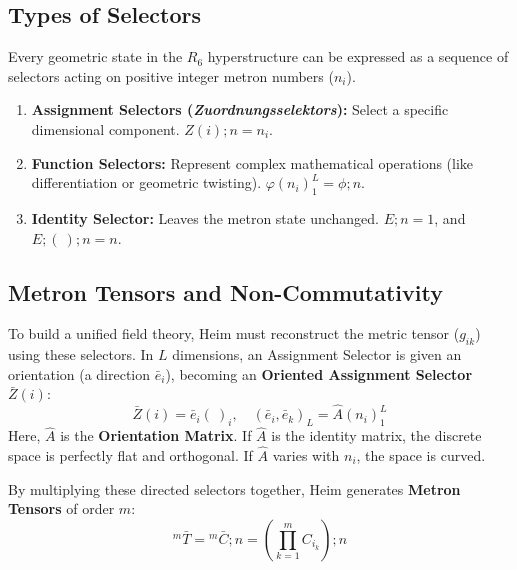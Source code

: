 \documentclass[11pt,a4paper,oneside]{article}
\begin{document}
\subsection{Types of Selectors}

Every geometric state in the $R_6$ hyperstructure can be expressed as a sequence of selectors acting on positive integer metron numbers ($n_i$).

\begin{enumerate}
    \item \textbf{Assignment Selectors (\textit{Zuordnungsselektors}):} Select a specific dimensional component. $Z(i); n = n_i$.
    \item \textbf{Function Selectors:} Represent complex mathematical operations (like differentiation or geometric twisting). $\varphi(n_i)_1^L = \phi; n$.
    \item \textbf{Identity Selector:} Leaves the metron state unchanged. $E; n = 1$, and $E; (\ ); n = n$.
\end{enumerate}

\subsection{Metron Tensors and Non-Commutativity}

To build a unified field theory, Heim must reconstruct the metric tensor ($g_{ik}$) using these selectors. In $L$ dimensions, an Assignment Selector is given an orientation (a direction $\bar{e}_i$), becoming an \textbf{Oriented Assignment Selector} $\bar{Z}(i)$:
\begin{equation}
    \bar{Z}(i) = \bar{e}_i (\ )_i, \quad (\bar{e}_i, \bar{e}_k)_L = \hat{A}(n_i)_1^L
\end{equation}
Here, $\hat{A}$ is the \textbf{Orientation Matrix}. If $\hat{A}$ is the identity matrix, the discrete space is perfectly flat and orthogonal. If $\hat{A}$ varies with $n_i$, the space is curved.

By multiplying these directed selectors together, Heim generates \textbf{Metron Tensors} of order $m$:
\begin{equation}
    {}^m \bar{T} = {}^m \bar{C}; n = \left( \prod_{k=1}^m C_{i_k} \right); n
\end{equation}
\end{document}
